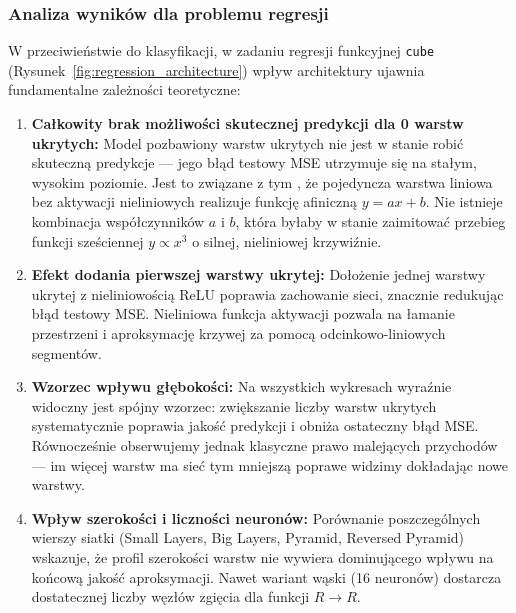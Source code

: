 \documentclass[11pt,a4paper]{article}
\begin{document}
\subsubsection{Analiza wyników dla problemu regresji}
W przeciwieństwie do klasyfikacji, w zadaniu regresji funkcyjnej \texttt{cube} (Rysunek~\ref{fig:regression_architecture}) wpływ architektury ujawnia fundamentalne zależności teoretyczne:
\begin{enumerate}
    \item \textbf{Całkowity brak możliwości skutecznej predykcji dla 0 warstw ukrytych:} 
    Model pozbawiony warstw ukrytych nie jest w stanie robić skuteczną predykcje — jego błąd testowy MSE utrzymuje się na stałym, wysokim poziomie. Jest to związane z tym , że pojedyncza warstwa liniowa bez aktywacji nieliniowych realizuje funkcję afiniczną $y = ax + b$. Nie istnieje kombinacja współczynników $a$ i $b$, która byłaby w stanie zaimitować przebieg funkcji sześciennej $y \propto x^3$ o silnej, nieliniowej krzywiźnie.

    \item \textbf{Efekt dodania pierwszej warstwy ukrytej:} 
    Dołożenie jednej warstwy ukrytej z nieliniowością ReLU poprawia zachowanie sieci, znacznie redukując błąd testowy MSE. Nieliniowa funkcja aktywacji pozwala na łamanie przestrzeni i aproksymację krzywej za pomocą odcinkowo-liniowych segmentów.

    \item \textbf{Wzorzec wpływu głębokości:} 
    Na wszystkich wykresach wyraźnie widoczny jest spójny wzorzec: zwiększanie liczby warstw ukrytych systematycznie poprawia jakość predykcji i obniża ostateczny błąd MSE. Równocześnie obserwujemy jednak klasyczne prawo malejących przychodów — im więcej warstw ma sieć tym mniejszą poprawe widzimy dokładając nowe warstwy.

    \item \textbf{Wpływ szerokości i liczności neuronów:} 
    Porównanie poszczególnych wierszy siatki (Small Layers, Big Layers, Pyramid, Reversed Pyramid) wskazuje, że profil szerokości warstw nie wywiera dominującego wpływu na końcową jakość aproksymacji. Nawet wariant wąski (16 neuronów) dostarcza dostatecznej liczby węzłów zgięcia dla funkcji $R \xrightarrow{} R$.
\end{enumerate}

\end{document}

